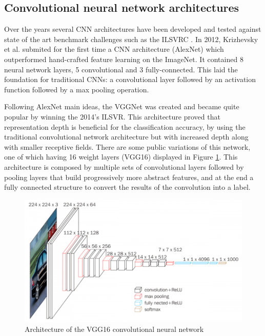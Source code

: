     
\subsection{Convolutional neural network architectures}
    Over the years several \ac{CNN} architectures have been developed and tested against state of the art benchmark challenges such as the \ac{ILSVRC} \cite{ilsvrc}. In 2012, Krizhevsky et al. \cite{alexnet} submited for the first time a \ac{CNN} architecture (AlexNet) which outperformed hand-crafted feature learning on the ImageNet. It contained 8 neural network layers, 5 convolutional and 3 fully-connected. This laid the foundation for traditional \ac{CNN}s: a convolutional layer followed by an activation function followed by a max pooling operation. \par
    Following AlexNet main ideas, the VGGNet\cite{vggnet} was created and became quite popular by winning the 2014’s ILSVR. This architecture proved that representation depth is beneficial for the classification accuracy, by using the traditional convolutional network architecture but with increased depth along with smaller receptive fields. There are some public variations of this network, one of which having 16 weight layers (VGG16) displayed in Figure \ref{fig:vgg16}. This architecture is composed by multiple sets of convolutional layers followed by pooling layers that build progressively more abstract features, and at the end a fully connected structure to convert the results of the convolution into a label.
    \begin{figure}[ht]
      \centering
        \includegraphics[scale=0.5, width=\linewidth]{figs/vgg16.png}
      \caption{Architecture of the VGG16 convolutional neural network \cite{vggnet}}
      \label{fig:vgg16}
    \end{figure}
    \par
